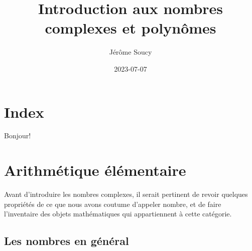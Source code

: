 \documentclass[
  letterpaper,
  DIV=11,
  numbers=noendperiod,
  oneside]{scrreprt}
\title{Introduction aux nombres complexes et polynômes}
\author{Jérôme Soucy}
\date{2023-07-07}
\renewcommand*\contentsname{Table of contents}
\newcommand\contentsname{Table of contents}
\theoremstyle{definition}
\theoremstyle{remark}
\begin{document}
\maketitle
\ifdefined\Shaded\renewenvironment{Shaded}{\begin{tcolorbox}[interior hidden, borderline west={3pt}{0pt}{shadecolor}, frame hidden, enhanced, boxrule=0pt, sharp corners, breakable]}{\end{tcolorbox}}\fi

\renewcommand*\contentsname{Table of contents}
{
\hypersetup{linkcolor=}
\setcounter{tocdepth}{2}
\tableofcontents
}

\hypertarget{index}{%
\chapter{Index}\label{index}}

Bonjour!


\hypertarget{arithmuxe9tique-uxe9luxe9mentaire}{%
\chapter{Arithmétique
élémentaire}\label{arithmuxe9tique-uxe9luxe9mentaire}}

\providecommand{\R}{\mathbb{R}}
\providecommand{\Q}{\mathbb{Q}}
\providecommand{\C}{\mathbb{C}}
\newcommand{\N}{\mathbb{N}}
\newcommand{\Z}{\mathbb{Z}}
\newcommand{\zbar}{\overline{z}}
\newcommand{\RE}{\textrm{Re}\,}
\newcommand{\IM}{\textrm{Im}\,}
\newcommand{\Arg}{\textrm{Arg}\,}
\newcommand{\iu}{\textrm{i}}
\newcommand{\boitevide}{\square}

Avant d'introduire les nombres complexes, il serait pertinent de revoir
quelques propriétés de ce que nous avons coutume d'appeler nombre, et de
faire l'inventaire des objets mathématiques qui appartiennent à cette
catégorie.

\hypertarget{les-nombres-en-guxe9nuxe9ral}{%
\section{Les nombres en général}\label{les-nombres-en-guxe9nuxe9ral}}
\end{document}
